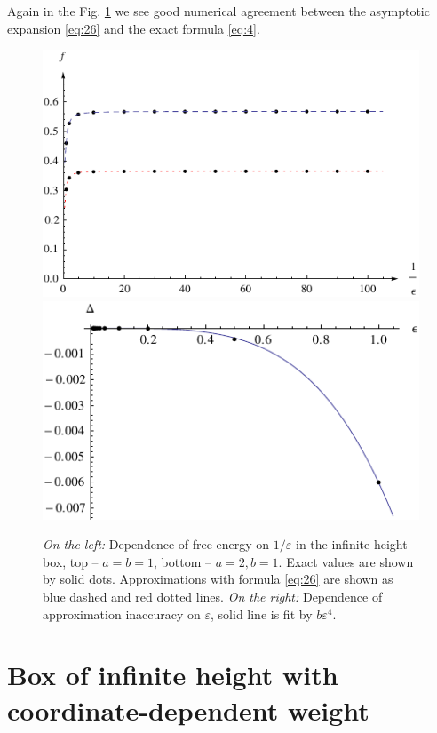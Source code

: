 \documentclass{article}
\begin{document}
Again in the Fig. \ref{fig:approx-acc-2d} we see good numerical agreement between the asymptotic
expansion \eqref{eq:26} and the exact formula \eqref{eq:4}.

\begin{figure}[htbp]
  \includegraphics[scale=0.8]{exact-vs-approximation-2d}
  \includegraphics[scale=0.9]{error-2d}
  \caption{\label{fig:approx-acc-2d} {\it On the left:} Dependence of free energy on $1/\varepsilon$
    in the infinite height box,
    top -- $a=b=1$, bottom -- $a=2, b=1$. Exact values are shown by solid dots.
    Approximations with formula \eqref{eq:26} are shown as blue dashed and red dotted lines. {\it On
      the right:} Dependence of approximation inaccuracy on $\varepsilon$, solid line is fit by $b\varepsilon^{4}$.}
\end{figure}

\section{Box of infinite height with coordinate-dependent weight}
\label{sec:box-infinite-height}
\end{document}
